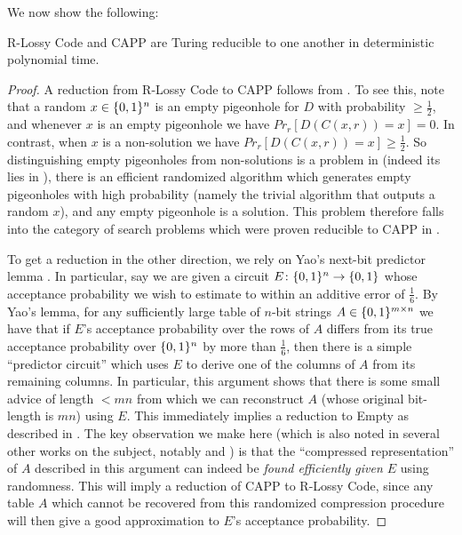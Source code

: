 We now show the following:
\begin{theorem}\label{lossy:thm:bpp-pigeon}
{\sc R-Lossy Code} and {\sc CAPP} are Turing reducible to one another in deterministic polynomial time.
\end{theorem}
\begin{proof}
A reduction from {\sc R-Lossy Code} to {\sc CAPP} follows from \cite{Goldreich}. To see this, note that a random $x \in \{0,1\}^n$ is an empty pigeonhole for $D$ with probability $\geq \frac{1}{2}$, and whenever $x$ is an empty pigeonhole we have $Pr_r[D(C(x,r))=x] = 0$. In contrast, when $x$ is a non-solution we have $Pr_r[D(C(x,r))=x] \geq \frac{1}{2}$. So distinguishing empty pigeonholes from non-solutions is a problem in  (indeed its lies in ), there is an efficient randomized algorithm which generates empty pigeonholes with high probability (namely the trivial algorithm that outputs a random $x$), and any empty pigeonhole is a solution. This problem therefore falls into the category of search problems which were proven reducible to {\sc CAPP} in \cite{Goldreich}.

To get a reduction in the other direction, we rely on Yao's next-bit predictor lemma \cite{Yao}. In particular, say we are given a circuit $E \colon \{0,1\}^n \to \{0,1\}$ whose acceptance probability we wish to estimate to within an additive error of $\frac{1}{6}$. By Yao's lemma, for any sufficiently large table of $n$-bit strings $A \in \{0,1\}^{m \times n}$ we have that if $E$'s acceptance probability over the rows of $A$ differs from its true acceptance probability over $\{0,1\}^n$ by more than $\frac{1}{6}$, then there is a simple ``predictor circuit'' which uses $E$ to derive one of the columns of $A$ from its remaining columns. In particular, this argument shows that there is some small advice of length $<mn$ from which we can reconstruct $A$ (whose original bit-length is $mn$) using $E$. This immediately implies a reduction to {\sc Empty} as described in \cite{Korten}. The key observation we make here (which is also noted in several other works on the subject, notably \cite{CIKK} and \cite{Hirahara}) is that the ``compressed representation'' of $A$ described in this argument can indeed be \emph{found efficiently given $E$} using randomness. This will imply a reduction of {\sc CAPP} to {\sc R-Lossy Code}, since any table $A$ which cannot be recovered from this randomized compression procedure will then give a good approximation to $E$'s acceptance probability.


\end{proof}
